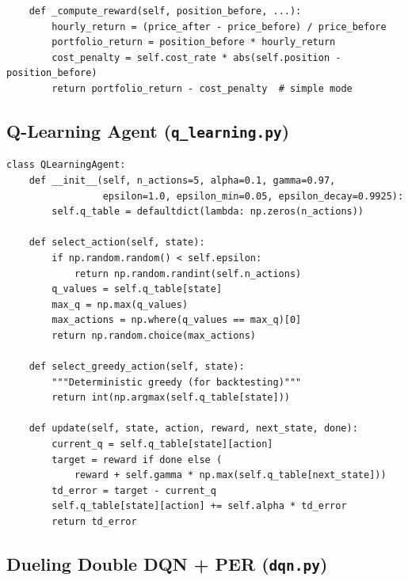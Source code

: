 \documentclass[11pt,a4paper]{article}
\begin{document}
\begin{lstlisting}
    def _compute_reward(self, position_before, ...):
        hourly_return = (price_after - price_before) / price_before
        portfolio_return = position_before * hourly_return
        cost_penalty = self.cost_rate * abs(self.position - position_before)
        return portfolio_return - cost_penalty  # simple mode
\end{lstlisting}

\subsection{Q-Learning Agent (\texttt{q\_learning.py})}

\begin{lstlisting}
class QLearningAgent:
    def __init__(self, n_actions=5, alpha=0.1, gamma=0.97,
                 epsilon=1.0, epsilon_min=0.05, epsilon_decay=0.9925):
        self.q_table = defaultdict(lambda: np.zeros(n_actions))

    def select_action(self, state):
        if np.random.random() < self.epsilon:
            return np.random.randint(self.n_actions)
        q_values = self.q_table[state]
        max_q = np.max(q_values)
        max_actions = np.where(q_values == max_q)[0]
        return np.random.choice(max_actions)

    def select_greedy_action(self, state):
        """Deterministic greedy (for backtesting)"""
        return int(np.argmax(self.q_table[state]))

    def update(self, state, action, reward, next_state, done):
        current_q = self.q_table[state][action]
        target = reward if done else (
            reward + self.gamma * np.max(self.q_table[next_state]))
        td_error = target - current_q
        self.q_table[state][action] += self.alpha * td_error
        return td_error
\end{lstlisting}

\subsection{Dueling Double DQN + PER (\texttt{dqn.py})}
\end{document}
